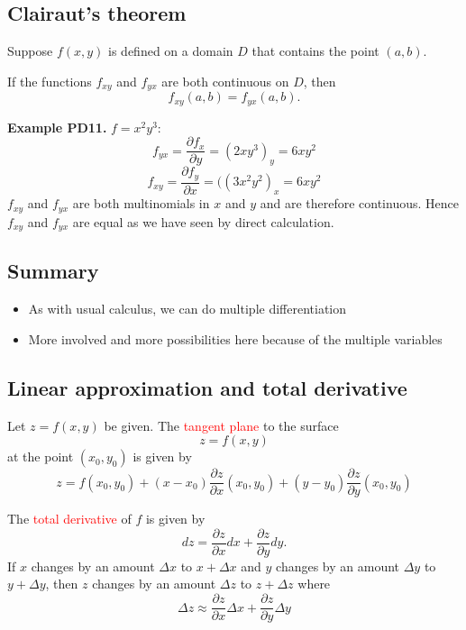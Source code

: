 \documentclass{article}
\begin{document}
\subsection{Clairaut's theorem} 

Suppose $f(x,y)$ is defined on a 
domain $D$ that contains the point $(a,b)$. 

If the functions $f_{xy}$ and $f_{yx}$ are both continuous on $D$, then
$$
f_{xy}(a,b)=f_{yx}(a,b).
$$



\textbf{Example PD11.} $f = x^2y^3$:
$$
f_{yx}= \frac{\partial f_x}{ \partial y} = (2xy^3)_y = 6 xy^2
$$
$$
f_{xy} = \frac{\partial f_y}{ \partial x} = ((3 x^2y^2)_x = 6 xy^2
$$
$f_{xy}$ and $f_{yx}$ are both multinomials in $x$ and $y$ and are therefore continuous. Hence
$f_{xy}$ and $f_{yx}$ are equal as we have seen by direct calculation.


\subsection{Summary}

\begin{itemize}
\item
As with usual calculus, we can do multiple differentiation
\item
More involved and more possibilities here because of the multiple variables
\end{itemize}


\subsection{Linear approximation and total derivative}

Let $z = f(x,y)$ be given. The \textcolor{red}{tangent plane} to the surface
$$
z=f(x,y)
$$
at the point $(x_0, y_0)$ is given by
$$
z = f(x_0, y_0) + (x-x_0) \frac{\partial z}{\partial x}(x_0,
y_0) + (y-y_0) \frac{\partial z}{\partial y}(x_0, y_0)
$$

The \textcolor{red}{total derivative} of $f$ is given by
$$ 
dz = \frac{\partial z}{\partial x} dx + \frac{\partial z}{\partial y} dy .
$$
If $x$ changes by an amount $\Delta x$ to $x + \Delta x$ and $y$ changes by an amount $\Delta y$ to $y + \Delta y$,
then $z$ changes by an amount $\Delta z$ to $z + \Delta z$ where
$$
\Delta z \approx  \frac{\partial z}{\partial x} \Delta x + \frac{\partial z}{\partial y} \Delta y 
$$
\end{document}
